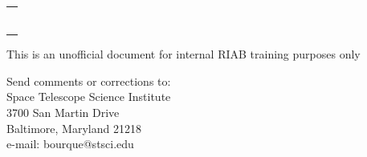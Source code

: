 \begin{titlepage}
\begin{table}[h]
\begin{tabular}{lll}
 
 \multicolumn{3}{c}{ \rule{130mm}{0.8mm}}      \\    
\end{tabular}
\end{table}%

This is an unofficial document for internal RIAB training purposes only


\vspace{120mm}

\begin{flushright}
Send comments or corrections to: \\
Space Telescope Science Institute \\
3700 San Martin Drive \\
Baltimore, Maryland 21218 \\
e-mail: bourque@stsci.edu
 \end{flushright}
\end{titlepage}